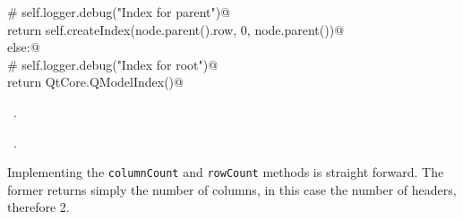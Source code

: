 \documentclass[
    a4paper,      %
    10pt,         %
    openright,    %
    notitlepage,  %
    parskip=half, %
]{scrreprt}       %
\theoremstyle{definition}                    %
\begin{document}
\begin{flushleft}
\begin{minipage}{\linewidth}
\begin{list}{}{}
\mbox{}\lstinline@        # self.logger.debug("Index for parent")@\\
\mbox{}\lstinline@        return self.createIndex(node.parent().row, 0, node.parent())@\\
\mbox{}\lstinline@    else:@\\
\mbox{}\lstinline@        # self.logger.debug("Index for root")@\\
\mbox{}\lstinline@        return QtCore.QModelIndex()@\\
\mbox{}\lstinline@@{\NWsep}
\end{list}
\vspace{-1.5ex}
\footnotesize
\begin{list}{}{\setlength{\itemsep}{-\parsep}\setlength{\itemindent}{-\leftmargin}}
\item \NWtxtMacroDefBy\ .
\item \NWtxtMacroRefIn\ .

\item{}
\end{list}
\end{minipage}\vspace{4ex}
\end{flushleft}
Implementing the \verb+columnCount+ and \verb+rowCount+ methods is straight
forward. The former returns simply the number of columns, in this case the
number of headers, therefore 2.
\end{document}
